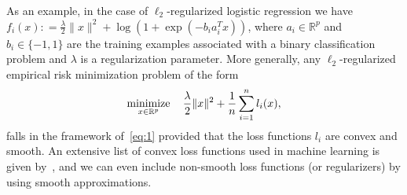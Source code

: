 \documentclass{article}
\def\minim{\mathop{\hbox{minimize}}}
\def\minimize#1{\displaystyle\minim_{#1}}
\def\Real{\mathbb{R}}
\def\defd{\mathrel{\mathop:}=} %
\begin{document}
As an example, in the case of $\ell_2$-regularized logistic
regression we have $f_i(x) \defd \frac{\lambda}{2}\|x\|^2 + \log(1+\exp(-b_ia_i^Tx))$, 
where $a_i \in \Real^p$ and $b_i \in \{-1,1\}$ are the training examples
associated with a binary classification problem and $\lambda$ is a
regularization parameter. More generally, any $\ell_2$-regularized empirical risk minimization problem of the
form
\begin{equation}
\label{eq:L2}
\minimize{x\in\Real^p}\quad \frac{\lambda}{2}\|x\|^2 + \frac{1}{n}\sum_{i=1}^n l_i(x),
\end{equation}
falls in the framework of~\eqref{eq:1} provided that the loss functions
$l_i$ are convex and smooth.
An extensive list of convex loss functions used in machine learning is given
by~\cite{teo2007scalable}, and  we can even include non-smooth loss functions
(or regularizers) by using smooth approximations.
\end{document}
